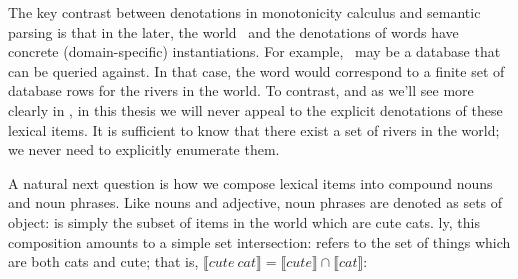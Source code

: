 The key contrast between denotations in monotonicity calculus and semantic parsing
  is that in the later, the world \sD\ and the denotations of words have concrete
  (domain-specific) instantiations.
For example, \sD\ may be a database that can be queried against.
In that case, the word  would correspond to a finite set of database rows
  for the rivers in the world.
To contrast, and as we'll see more clearly in , in this thesis we
  will never appeal to the explicit denotations of these lexical items.
It is sufficient to know that there exist a set of rivers in the world; we never need
  to explicitly enumerate them.


%
%
A natural next question is how we compose lexical items into compound nouns 
  and noun phrases.
Like nouns and adjective, noun phrases are denoted as sets of object:
   is simply the subset of items in the world which are cute cats.
\Naive ly, this composition amounts to a simple set intersection: 
  refers to the set of things which are both cats and cute;
  that is, 
  $\llbracket cute~cat \rrbracket = \llbracket cute \rrbracket \cap \llbracket cat \rrbracket$:
  

